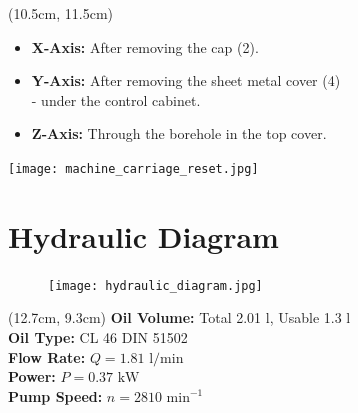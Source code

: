 \begin{textblock*}{\textwidth}(10.5cm, 11.5cm)
\begin{itemize}
    \item \textbf{X-Axis:} After removing the cap (2).  
    \item \textbf{Y-Axis:} After removing the sheet metal cover (4) \\- under the control cabinet.  
    \item \textbf{Z-Axis:} Through the borehole in the top cover.  
\end{itemize}

\vspace{0.3cm}


\end{textblock*}

\begin{minipage}{\textwidth}
    \centering
    \texttt{[image: machine\_carriage\_reset.jpg]}
\end{minipage}

\section{Hydraulic Diagram}
\setcounter{section}{18}

\begin{figure}[h]
    \centering
    \texttt{[image: hydraulic\_diagram.jpg]}
\end{figure}

\begin{textblock*}{\textwidth}(12.7cm, 9.3cm)
    \noindent
    \textbf{Oil Volume:} Total 2.01 l, Usable 1.3 l \\
    \textbf{Oil Type:} CL 46 DIN 51502 \\
    \textbf{Flow Rate:} $Q = 1.81 \text{ l/min}$ \\
    \textbf{Power:} $P = 0.37 \text{ kW}$ \\
    \textbf{Pump Speed:} $n = 2810 \text{ min}^{-1}$
\end{textblock*}

